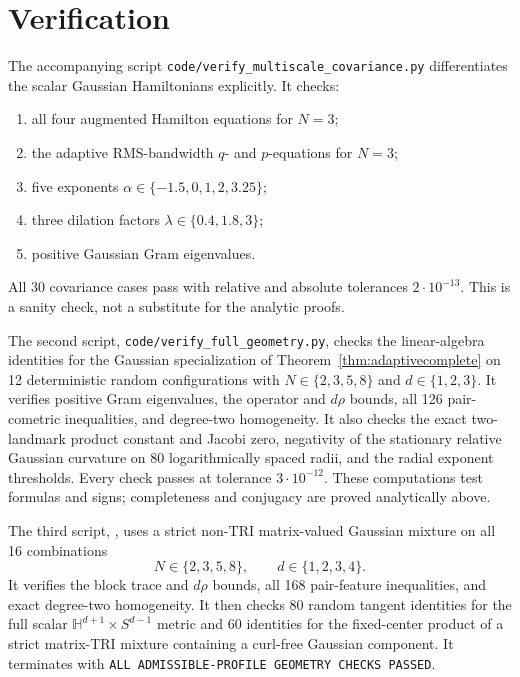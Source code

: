 \documentclass[11pt]{article}
\begin{document}
\section*{Verification}

The accompanying script
\texttt{code/verify\_multiscale\_covariance.py} differentiates the scalar
Gaussian Hamiltonians explicitly.  It checks:
\begin{enumerate}
\item all four augmented Hamilton equations for \(N=3\);
\item the adaptive RMS-bandwidth \(q\)- and \(p\)-equations for \(N=3\);
\item five exponents \(\alpha\in\{-1.5,0,1,2,3.25\}\);
\item three dilation factors \(\lambda\in\{0.4,1.8,3\}\);
\item positive Gaussian Gram eigenvalues.
\end{enumerate}
All 30 covariance cases pass with relative and absolute tolerances
\(2\cdot10^{-13}\).  This is a sanity check, not a substitute for the
analytic proofs.

The second script, \texttt{code/verify\_full\_geometry.py}, checks the
linear-algebra identities for the Gaussian specialization of
Theorem~\ref{thm:adaptivecomplete} on 12
deterministic random configurations with
\(N\in\{2,3,5,8\}\) and \(d\in\{1,2,3\}\).  It verifies positive Gram
eigenvalues, the operator and \(d\rho\) bounds, all 126 pair-cometric
inequalities, and degree-two homogeneity.  It also checks the exact
two-landmark product constant and Jacobi zero, negativity of the stationary
relative Gaussian curvature on 80 logarithmically spaced radii, and the
radial exponent thresholds.  Every check passes at tolerance
\(3\cdot10^{-12}\).  These computations test formulas and signs; completeness
and conjugacy are proved analytically above.

The third script,
, uses a strict
non-TRI matrix-valued Gaussian mixture on all 16 combinations
\[
 N\in\{2,3,5,8\},\qquad d\in\{1,2,3,4\}.
\]
It verifies the block trace and \(d\rho\) bounds, all 168 pair-feature
inequalities, and exact degree-two homogeneity.  It then checks 80 random
tangent identities for the full scalar
\(\mathbb H^{d+1}\times S^{d-1}\) metric and 60 identities for the
fixed-center product of a strict matrix-TRI mixture containing a curl-free
Gaussian component.  It terminates with
\texttt{ALL ADMISSIBLE-PROFILE GEOMETRY CHECKS PASSED}.
\end{document}

